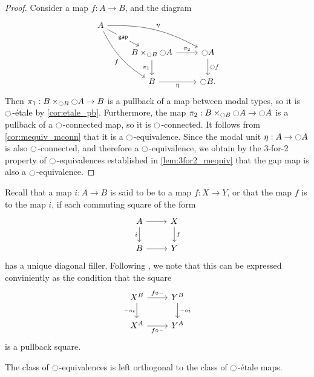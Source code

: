 \documentclass[9pt,twosided]{amsart}
\begin{document}
\begin{proof}
Consider a map $f:A\to B$, and the diagram
\begin{equation*}
\begin{tikzcd}
A \arrow[ddr,bend right=15,swap,"f"] \arrow[drr,bend left=15,"\modalunit"] \arrow[dr,"\mathsf{gap}" description] \\
& B\times_{\modal B} \modal A \arrow[d,swap,"\pi_1"] \arrow[r,"\pi_2"] & \modal A \arrow[d,"\modal f"] \\
& B \arrow[r,swap,"\modalunit"] & \modal B.
\end{tikzcd}
\end{equation*}
Then $\pi_1:B\times_{{\ocircle} B} {\ocircle} A\to B$ is a pullback of a map between modal types, so it is ${\ocircle}$-\'etale by \cref{cor:etale_pb}. Furthermore, the map $\pi_2:B\times_{{\ocircle} B}{\ocircle} A\to {\ensuremath{\ocircle}} A$ is a pullback of a ${\ocircle}$-connected map, so it is ${\ocircle}$-connected. It follows from \cref{cor:mequiv_mconn} that it is a ${\ocircle}$-equivalence. Since the modal unit ${\eta_{}} :A\to{\ensuremath{\ocircle}} A$ is also ${\ocircle}$-connected, and therefore a ${\ocircle}$-equivalence, we obtain by the 3-for-2 property of ${\ocircle}$-equivalences established in \cref{lem:3for2_mequiv} that the gap map is also a ${\ocircle}$-equivalence.
\end{proof}

Recall that a map $i:A\to B$ is said to be  to a map $f:X\to Y$, or that the map $f$ is  to the map $i$,
if each commuting square of the form
\begin{equation*}
\begin{tikzcd}
A \arrow[r] \arrow[d,swap,"i"] & X \arrow[d,"f"] \\
B \arrow[r] & Y
\end{tikzcd}
\end{equation*}
has a unique diagonal filler. Following \cite{AnelBiedermanFinsterJoyal}, we note that this can be expressed conviniently as the condition that the square
\begin{equation*}
\begin{tikzcd}
X^B \arrow[r,"f\circ\blank"] \arrow[d,swap,"\blank\circ i"] & Y^B \arrow[d,"\blank\circ i"] \\
X^A \arrow[r,swap,"f\circ\blank"] & Y^A
\end{tikzcd}
\end{equation*}
is a pullback square.

\begin{lem}\label{lem:rfs_orthogonal}
The class of ${\ocircle}$-equivalences is left orthogonal to the class of ${\ocircle}$-\'etale maps.
\end{lem}
\end{document}
